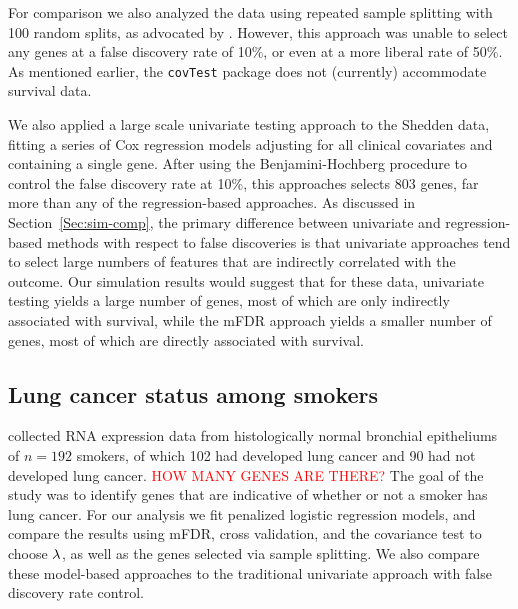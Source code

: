 For comparison we also analyzed the data using repeated sample splitting with 100 random splits, as advocated by  \citet{Meinshausen2009}. However, this approach was unable to select any genes at a false discovery rate of 10\%, or even at a more liberal rate of 50\%.
As mentioned earlier, the {\tt covTest} package does not (currently) accommodate survival data.

We also applied a large scale univariate testing approach to the Shedden data, fitting a series of Cox regression models adjusting for all clinical covariates and containing a single gene.  After using the Benjamini-Hochberg procedure to control the false discovery rate at 10\%, this approaches selects 803 genes, far more than any of the regression-based approaches.  As discussed in Section~\ref{Sec:sim-comp}, the primary difference between univariate and regression-based methods with respect to false discoveries is that univariate approaches tend to select large numbers of features that are indirectly correlated with the outcome.  Our simulation results would suggest that for these data, univariate testing yields a large number of genes, most of which are only indirectly associated with survival, while the mFDR approach yields a smaller number of genes, most of which are directly associated with survival.

\subsection{Lung cancer status among smokers}

\citet{Spira2007} collected RNA expression data from histologically normal bronchial epitheliums of $n = 192$ smokers, of which 102 had developed lung cancer and 90 had not developed lung cancer.
\textcolor{red}{HOW MANY GENES ARE THERE?}
The goal of the study was to identify genes that are indicative of whether or not a smoker has lung cancer.  For our analysis we fit penalized logistic regression models, and compare the results using mFDR, cross validation, and the covariance test to choose $\lambda$, as well as the genes selected via sample splitting.   We also compare these model-based approaches to the traditional univariate approach with false discovery rate control.

